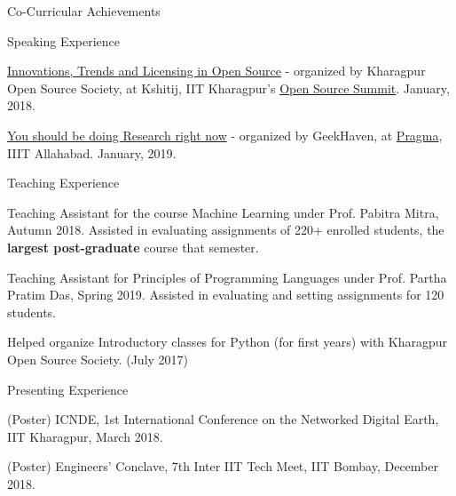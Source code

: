 \documentclass{resume} %
\begin{document}
\begin{rSection}{Co-Curricular Achievements}
\vspace{2em}
\begin{rSubsection}{\large Speaking Experience}{}{}{}

\item \href{https://www.youtube.com/watch?v=lk4ciY3NSbA}{Innovations, Trends and Licensing in Open Source} - organized by Kharagpur Open Source Society, at Kshitij, IIT Kharagpur's \href{https://www.facebook.com/events/1387262571380225/}{Open Source Summit}. January, 2018.
\item \href{https://twitter.com/IIITAPragma/status/1085833015995953152}{You should be doing Research right now} - organized by GeekHaven, at \href{https://pragmaconf.tech}{Pragma}, IIIT Allahabad. January, 2019.

\end{rSubsection}

\begin{rSubsection}{\large Teaching Experience}{}{}{}

\item Teaching Assistant for the course Machine Learning under Prof. Pabitra Mitra, Autumn 2018. Assisted in evaluating assignments of 220+ enrolled students, the \textbf{largest post-graduate} course that semester.
\item Teaching Assistant for Principles of Programming Languages under Prof. Partha Pratim Das, Spring 2019. Assisted in evaluating and setting assignments for 120 students.
\item Helped organize Introductory classes for Python (for first years) with Kharagpur Open Source Society. (July 2017)
\end{rSubsection}

\begin{rSubsection}{\large Presenting Experience}{}{}{}

\item (Poster) ICNDE, 1st International Conference on the Networked Digital Earth, IIT Kharagpur, March 2018.
\item (Poster) Engineers' Conclave, 7th Inter IIT Tech Meet, IIT Bombay, December 2018.

\end{rSubsection}



\end{rSection}
\end{document}
